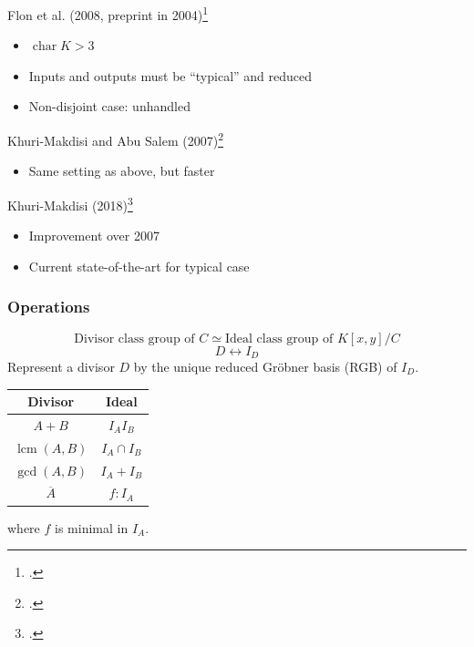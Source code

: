 \documentclass{beamer}
\newcommand{\pid}[1]{\left\langle #1 \right\rangle}
\newcommand{\defn}{\textbf}
\DeclareMathOperator{\Char}{char}
\DeclareMathOperator{\lcm}{lcm}
\renewcommand{\bar}{\overline}
\begin{document}

\begin{frame}
  Flon et al. (2008, preprint in 2004)\footcite{flon08}
  \begin{itemize}
    \item $\Char K > 3$
    \item Inputs and outputs must be ``typical'' and reduced
    \item Non-disjoint case: unhandled
  \end{itemize}
  \vspace{10pt}
  Khuri-Makdisi and Abu Salem (2007)\footcite{kamal07}
  \begin{itemize}
    \item Same setting as above, but faster
  \end{itemize}
  \vspace{10pt}
  Khuri-Makdisi (2018)\footcite{kamal18}
  \begin{itemize}
    \item Improvement over 2007
    \item Current state-of-the-art for typical case
  \end{itemize}
\end{frame}


\begin{frame}
\frametitle{Operations}
  \[ \text{Divisor class group of $C$} \simeq \text{Ideal class group of $K[x,y]/C$}\]
  \[ D \longleftrightarrow I_D \]
  Represent a divisor $D$ by the unique reduced Gr\"obner basis (RGB) of $I_D$. \\
  \begin{center}
    \begin{tabular}{c|c}
      Divisor & Ideal \\
      \hline
      $A + B$ & $I_A I_B$ \\
      $\lcm(A,B)$ & $I_A \cap I_B$ \\
      $\gcd(A,B)$ & $I_A + I_B$ \\
      $\bar A$ & $f : I_A$
    \end{tabular}
  \end{center}
  where $f$ is minimal in $I_A$.
\end{frame}
\end{document}
